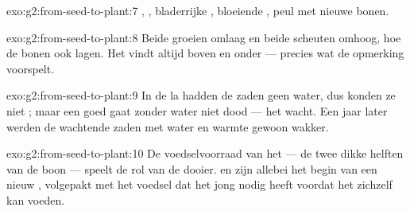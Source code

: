 \begin{solution}{exo:g2:from-seed-to-plant:7}
, , bladerrijke , bloeiende , peul met nieuwe bonen.
\end{solution}

\begin{solution}{exo:g2:from-seed-to-plant:8}
Beide  groeien omlaag en beide scheuten omhoog, hoe de bonen ook
lagen. Het  vindt altijd boven en onder --- precies wat de
opmerking voorspelt.
\end{solution}

\begin{solution}{exo:g2:from-seed-to-plant:9}
In de la hadden de zaden geen water, dus konden ze niet ; maar
een goed  gaat zonder water niet dood --- het wacht. Een jaar later
werden de wachtende zaden met water en warmte gewoon wakker.
\end{solution}

\begin{solution}{exo:g2:from-seed-to-plant:10}
De voedselvoorraad van het  --- de twee dikke helften van de boon
--- speelt de rol van de dooier.  en  zijn allebei het begin van
een nieuw , volgepakt met het voedsel dat het jong nodig
heeft voordat het zichzelf kan voeden.
\end{solution}
